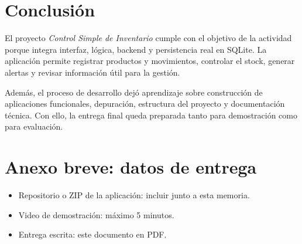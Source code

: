 \documentclass[12pt,a4paper]{article}
\begin{document}
\section{Conclusión}

El proyecto \textit{Control Simple de Inventario} cumple con el objetivo de la actividad porque integra interfaz, lógica, backend y persistencia real en SQLite. La aplicación permite registrar productos y movimientos, controlar el stock, generar alertas y revisar información útil para la gestión.

Además, el proceso de desarrollo dejó aprendizaje sobre construcción de aplicaciones funcionales, depuración, estructura del proyecto y documentación técnica. Con ello, la entrega final queda preparada tanto para demostración como para evaluación.

\section{Anexo breve: datos de entrega}

\begin{itemize}[leftmargin=1.2cm]
    \item Repositorio o ZIP de la aplicación: incluir junto a esta memoria.
    \item Video de demostración: máximo 5 minutos.
    \item Entrega escrita: este documento en PDF.
\end{itemize}
\end{document}
